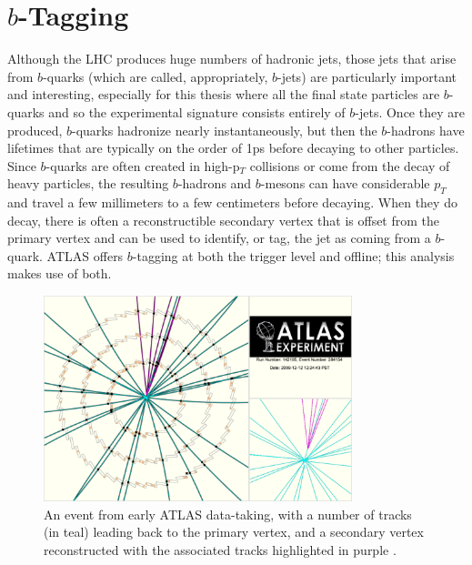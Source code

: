 \section{$b$-Tagging}
\label{sec:b-tag}

Although the LHC produces huge numbers of hadronic jets, those jets that arise from $b$-quarks
(which are called, appropriately, $b$-jets) are particularly important and interesting,
especially for this thesis where all the final state particles are $b$-quarks and so the 
experimental signature consists entirely of $b$-jets.
Once they are produced, $b$-quarks hadronize nearly instantaneously, but then
the $b$-hadrons have lifetimes that are typically on the order of 1ps before
decaying to other particles. 
Since $b$-quarks are often created in high-p$_T$ collisions or come from the decay 
of heavy particles, the resulting $b$-hadrons and $b$-mesons can have considerable $p_T$ and travel a few millimeters to a few centimeters before decaying.
When they do decay, there is often a reconstructible secondary vertex that is offset from
the primary vertex and can be used to identify, or tag, the jet as coming from a $b$-quark.  
ATLAS offers $b$-tagging at both the trigger level and offline; this analysis makes use of both.


\begin{figure}
    \center
	\includegraphics[width=0.8\textwidth]{ReconstructionPerformance/images/secondary_vertex.pdf}
	\caption{An event from early ATLAS data-taking, with a number of tracks (in teal) leading back to the primary vertex, and a secondary vertex reconstructed with the associated tracks highlighted in purple \cite{sv}.	\label{fig:secondary_vertex}  }
\end{figure}



